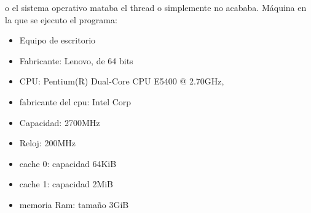 \documentclass[11 pt, a4paper]{article}
\theoremstyle{definition}
\begin{document}
\begin{enumerate}
   o el sistema operativo mataba el thread o simplemente no acababa. 
   Máquina en la que se ejecuto el programa:
   \begin{itemize}
    \item  Equipo de escritorio
    \item Fabricante: Lenovo, de 64 bits
    \item CPU: Pentium(R) Dual-Core CPU E5400 @ 2.70GHz,
    \item fabricante del cpu: Intel Corp
    \item Capacidad: 2700MHz
    \item Reloj: 200MHz
    \item cache 0: capacidad 64KiB
    \item cache 1: capacidad 2MiB
    \item memoria Ram: tamaño 3GiB
   \end{itemize}

  



\end{enumerate}
\end{document}
